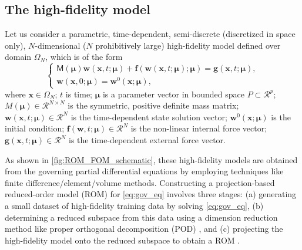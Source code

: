 \documentclass[11pt]{article}
\renewcommand{\vec}[1]{\mathbf{#1}}
\newcommand{\mat}[1]{\mathsf{#1}}
\begin{document}
    \subsection{The high-fidelity model}

    Let us consider a parametric, time-dependent, semi-discrete (discretized in space only), $N$-dimensional ($N$ prohibitively large) high-fidelity model defined over domain $\Omega_N$, which is of the form \cite{benner_2021}
    \begin{equation}
    \left\{
    \begin{array}{l}
        \mat{M}(\boldsymbol{\mu})\dot{\vec{w}}(\vec{x},t; \boldsymbol{\mu}) + \vec{f}(\vec{w}(\vec{x},t; \boldsymbol{\mu}); \boldsymbol{\mu}) = \vec{g}(\vec{x},t; \boldsymbol{\mu}),\\
        \vec{w}(\vec{x},0; \boldsymbol{\mu}) = \vec{w}^0(\vec{x};\boldsymbol{\mu}),
    \end{array}
    \right.
    \label{eq:gov_eq}
    \end{equation}
    where $\vec{x}\in\Omega_N$; $t$ is time; $\boldsymbol{\mu}$ is a parameter vector in bounded space $P \subset \mathcal{R}^p$; $M(\boldsymbol{\mu}) \in \mathcal{R}^{N \times N}$ is the symmetric, positive definite mass matrix; $\vec{w}(\vec{x},t; \boldsymbol{\mu}) \in \mathcal{R}^{N}$ is the time-dependent state solution vector; $\vec{w}^0(\vec{x};\boldsymbol{\mu})$ is the initial condition; $\vec{f}(\vec{w}, t; \boldsymbol{\mu}) \in \mathcal{R}^{N}$ is the non-linear internal force vector; $\vec{g}(\vec{x},t; \boldsymbol{\mu}) \in \mathcal{R}^{N}$ is the time-dependent external force vector.

    As shown in \cref{fig:ROM_FOM_schematic}, these high-fidelity models are obtained from the governing partial differential equations by employing techniques like finite difference/element/volume methods.
    Constructing a projection-based reduced-order model (ROM) for \cref{eq:gov_eq} involves three stages: (a) generating a small dataset of high-fidelity training data by solving \cref{eq:gov_eq}, (b) determining a reduced subspace from this data using a dimension reduction method like proper orthogonal decomposition (POD) \cite{holmes1996turbulence}, and (c) projecting the high-fidelity model onto the reduced subspace to obtain a ROM \cite{benner2015survey}.
\end{document}
